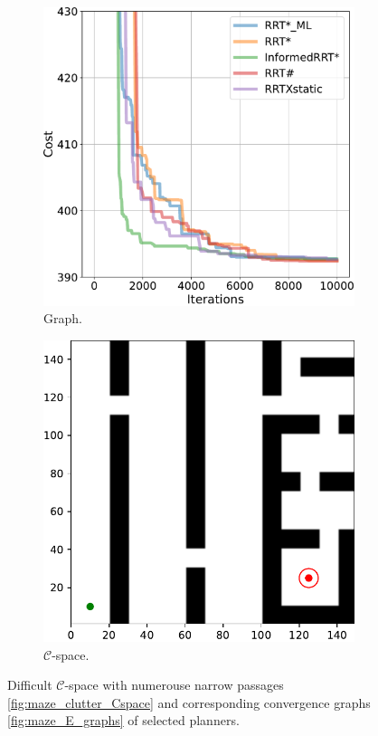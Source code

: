 \documentclass{ctuthesis}
\begin{document}
\begin{figure}[!ht]
  \centering 
  \begin{subfigure}[b]{0.48\textwidth}
    \includegraphics[width=\textwidth]{figChap5/graph_narrow_20pt_ticks.pdf}  
    \caption{Graph.}
    \label{fig:maze_narrow_graphs}
  \end{subfigure}
  \begin{subfigure}[b]{0.49\textwidth}
      \includegraphics[width=\textwidth]{figChap5/Maze_narrow_ticks.pdf}
      \caption{$\mathcal{C}$-space.}
      \label{fig:maze_narrow_Cspace}  
  \end{subfigure}  
  \caption{Difficult  $\mathcal{C}$-space with numerouse narrow passages \ref{fig:maze_clutter_Cspace} 
  and corresponding convergence graphs \ref{fig:maze_E_graphs} of selected planners.}
  \label{fig:maze_narrow}
\end{figure}
\end{document}
